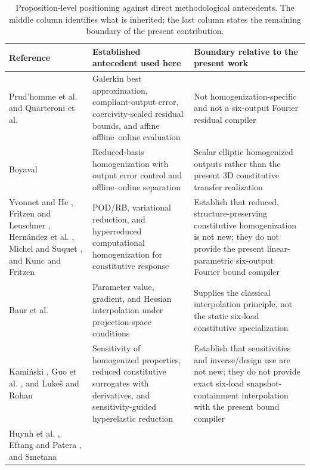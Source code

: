 \begin{table}
\centering
\caption{Proposition-level positioning against direct methodological
antecedents.  The middle column identifies what is inherited; the last column
states the remaining boundary of the present contribution.}
\label{tab:literature}
\small
\begin{tabularx}{\textwidth}{p{}p{}X}
\toprule
Reference & Established antecedent used here & Boundary relative to the present work \\
\midrule
Prud'homme et al. \cite{prudhomme2002reliable} and Quarteroni et al. \cite{quarteroni2011certified}
& Galerkin best approximation, compliant-output error, coercivity-scaled residual bounds, and affine offline--online evaluation
& Not homogenization-specific and not a six-output Fourier residual compiler \\
Boyaval \cite{boyaval2008homogenization}
& Reduced-basis homogenization with output error control and offline--online separation
& Scalar elliptic homogenized outputs rather than the present 3D constitutive transfer realization \\
Yvonnet and He \cite{yvonnet2007r3m}, Fritzen and Leuschner \cite{fritzen2013hybrid}, Hern\'andez et al. \cite{hernandez2014highperformance}, Michel and Suquet \cite{michel2016variational}, and Kunc and Fritzen \cite{kunc2019finite}
& POD/RB, variational reduction, and hyperreduced computational homogenization for constitutive response
& Establish that reduced, structure-preserving constitutive homogenization is not new; they do not provide the present linear-parametric six-output Fourier bound compiler \\
Baur et al. \cite{baur2011interpolatory}
& Parameter value, gradient, and Hessian interpolation under projection-space conditions
& Supplies the classical interpolation principle, not the static six-load constitutive specialization \\
Kami\'nski \cite{kaminski2003sensitivity}, Guo et al. \cite{guo2021constitutive}, and Luke\v{s} and Rohan \cite{lukes2026sensitivity}
& Sensitivity of homogenized properties, reduced constitutive surrogates with derivatives, and sensitivity-guided hyperelastic reduction
& Establish that sensitivities and inverse/design use are not new; they do not provide exact six-load snapshot-containment interpolation with the present bound compiler \\
Huynh et al. \cite{huynh2013scrbe}, Eftang and Patera \cite{eftang2013port}, and Smetana \cite{smetana2015certification}

\end{tabularx}
\end{table}
